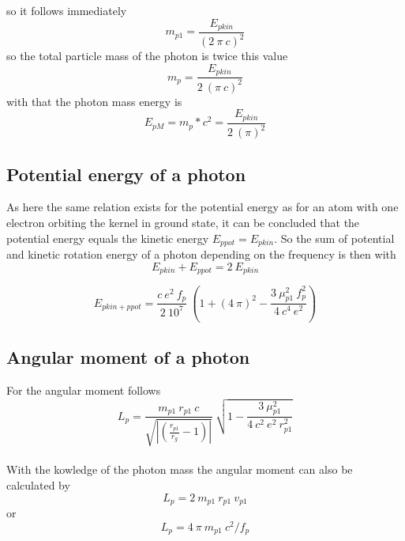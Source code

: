 \documentclass[10pt,titlepage]{article}
\begin{document}
so it follows immediately
\begin{equation}
m_{p1}=\frac{E_{pkin}}{(2 \ \pi \ c)^2}
\end{equation}
so the total particle mass of the photon is twice this value 
\begin{equation}
m_{p}=\frac{E_{pkin}}{2 \ (\pi \ c)^2}
\end{equation}
with that the photon mass energy is
\begin{equation}
\label{eqEpM}
E_{pM}=m_{p}*c^2=\frac{E_{pkin}}{2 \ (\pi)^2}
\end{equation}





\subsection{Potential energy of a photon}
As here the same relation exists for the potential energy as for an atom with one electron orbiting the kernel in ground state, it can be concluded that the potential energy equals the kinetic energy $E_{ppot} = E_{pkin}$.
So the sum of potential and kinetic rotation energy of a photon depending on the frequency is then with
\begin{equation}
E_{pkin}+E_{ppot}= 2 \ E_{pkin}
\end{equation}

\begin{equation}
E_{pkin+ppot}=\frac{c \ e^2 \ f_p}{2 \ 10^7} \ (1 + (4 \ \pi)^2-\frac{3 \ \mu_{p1}^2 \ f_p^2}{4 \ c^4 \ e^2})
\end{equation}


\subsection{Angular moment of a photon}
For the angular moment follows
\\
\begin{equation}
L_p=\frac{m_{p1} \ r_{p1} \ c}{\sqrt{|(\frac{r_{p1}}{r_g}-1)|}} \ \sqrt{1-\frac{3 \ \mu_{p1}^2}{4 \ c^2 \ e^2 \ r_{p1}^2}}\end{equation}
\\
With the kowledge of the photon mass the angular moment can also be calculated by
\begin{equation}
L_p=2 \ m_{p1} \ r_{p1} \ v_{p1}
\end{equation}
 or
\begin{equation}
L_p=4 \ \pi \ m_{p1} \ c^2/f_p
\end{equation}
\\\\
\end{document}
